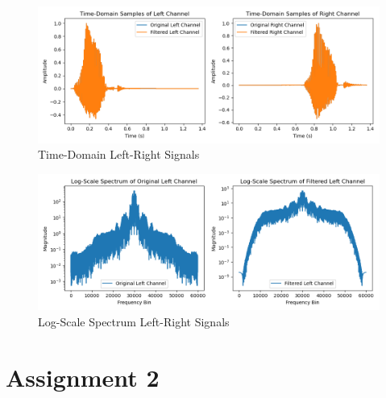 \documentclass[
	letterpaper, %
	10pt, %
]{CSUniSchoolLabReport}
\begin{document}
\begin{figure}[H] %
	\centering %
	\includegraphics[width=1.2\textwidth]{assignment1a.png} %
	\caption{Time-Domain Left-Right Signals}
	\label{fig:block}
\end{figure}

\begin{figure}[H] %
	\centering %
	\includegraphics[width=1.2\textwidth]{assignment1b.png} %
	\caption{Log-Scale Spectrum Left-Right Signals}
	\label{fig:block}
\end{figure}

\section{Assignment 2}
\end{document}
